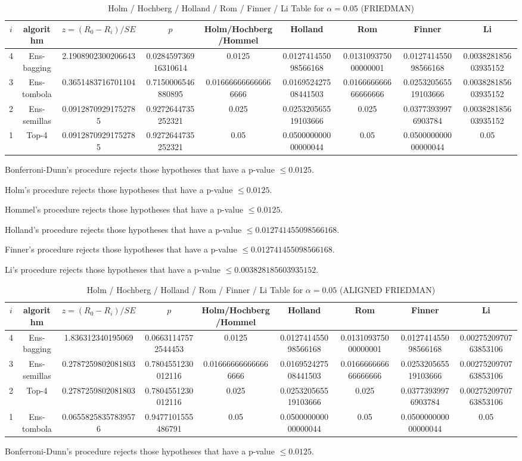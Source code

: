 \documentclass[a4paper,10pt]{article}
\begin{document}
\begin{landscape}
\begin{table}[!htp]
\centering\scriptsize
\caption{Holm / Hochberg / Holland / Rom / Finner / Li Table for $\alpha=0.05$ (FRIEDMAN)}
\begin{tabular}{ccccccccc}
$i$&algorithm&$z=(R_0 - R_i)/SE$&$p$&Holm/Hochberg/Hommel&Holland&Rom&Finner&Li\\
\hline
4&Ens-bagging&2.1908902300206643&0.028459736916310614&0.0125&0.012741455098566168&0.013109375000000001&0.012741455098566168&0.003828185603935152\\
3&Ens-tombola&0.3651483716701104&0.7150006546880895&0.016666666666666666&0.016952427508441503&0.016666666666666666&0.025320565519103666&0.003828185603935152\\
2&Ens-semillas&0.09128709291752785&0.9272644735252321&0.025&0.025320565519103666&0.025&0.03773939976903784&0.003828185603935152\\
1&Top-4&0.09128709291752785&0.9272644735252321&0.05&0.050000000000000044&0.05&0.050000000000000044&0.05\\
\hline
\end{tabular}
\end{table}
Bonferroni-Dunn's procedure rejects those hypotheses that have a p-value $\le0.0125$.


Holm's procedure rejects those hypotheses that have a p-value $\le0.0125$.


Hommel's procedure rejects those hypotheses that have a p-value $\le0.0125$.


Holland's procedure rejects those hypotheses that have a p-value $\le0.012741455098566168$.


Finner's procedure rejects those hypotheses that have a p-value $\le0.012741455098566168$.


Li's procedure rejects those hypotheses that have a p-value $\le0.003828185603935152$.



\newpage

\begin{table}[!htp]
\centering\scriptsize
\caption{Holm / Hochberg / Holland / Rom / Finner / Li Table for $\alpha=0.05$ (ALIGNED FRIEDMAN)}
\begin{tabular}{ccccccccc}
$i$&algorithm&$z=(R_0 - R_i)/SE$&$p$&Holm/Hochberg/Hommel&Holland&Rom&Finner&Li\\
\hline
4&Ens-bagging&1.836312340195069&0.06631147572544453&0.0125&0.012741455098566168&0.013109375000000001&0.012741455098566168&0.0027520970763853106\\
3&Ens-semillas&0.2787259802081803&0.7804551230012116&0.016666666666666666&0.016952427508441503&0.016666666666666666&0.025320565519103666&0.0027520970763853106\\
2&Top-4&0.2787259802081803&0.7804551230012116&0.025&0.025320565519103666&0.025&0.03773939976903784&0.0027520970763853106\\
1&Ens-tombola&0.06558258357839576&0.9477101555486791&0.05&0.050000000000000044&0.05&0.050000000000000044&0.05\\
\hline
\end{tabular}
\end{table}
Bonferroni-Dunn's procedure rejects those hypotheses that have a p-value $\le0.0125$.



\end{landscape}
\end{document}
